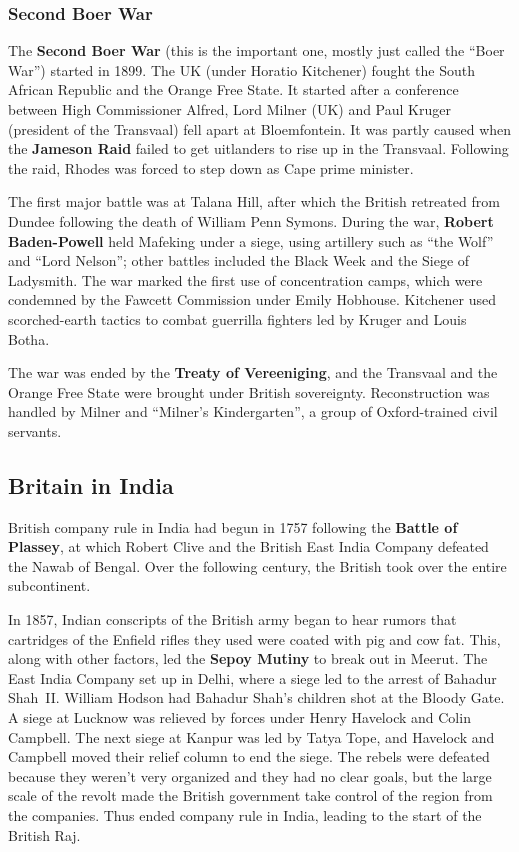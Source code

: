 \subsubsection*{Second Boer War}

The \textbf{Second Boer War}
(this is the important one, mostly just called the ``Boer War'') started in 1899.
The UK (under Horatio Kitchener) fought the South African Republic and the Orange Free State.
It started after a conference between High Commissioner Alfred, Lord Milner (UK)
and Paul Kruger (president of the Transvaal)
fell apart at Bloemfontein.
It was partly caused when the \textbf{Jameson Raid}
failed to get uitlanders to rise up in the Transvaal.
Following the raid, Rhodes was forced to step down as Cape prime minister.

The first major battle was at Talana Hill,
after which the British retreated from Dundee following the death of William Penn Symons.
During the war, \textbf{Robert Baden-Powell} held Mafeking under a siege,
using artillery such as ``the Wolf'' and ``Lord Nelson'';
other battles included the Black Week and the Siege of Ladysmith.
The war marked the first use of concentration camps,
which were condemned by the Fawcett Commission under Emily Hobhouse.
Kitchener used scorched-earth tactics to combat guerrilla fighters led by Kruger and Louis Botha.

The war was ended by the \textbf{Treaty of Vereeniging},
and the Transvaal and the Orange Free State were brought under British sovereignty.
Reconstruction was handled by Milner and ``Milner's Kindergarten'',
a group of Oxford-trained civil servants.

\subsection*{Britain in India}

British company rule in India had begun in 1757 following the \textbf{Battle of Plassey},
at which Robert Clive and the British East India Company defeated the Nawab of Bengal.
Over the following century, the British took over the entire subcontinent.

In 1857,
Indian conscripts of the British army began to hear rumors
that cartridges of the Enfield rifles they used
were coated with pig and cow fat.
This, along with other factors, led the \textbf{Sepoy Mutiny} to break out in Meerut.
The East India Company set up in Delhi, where a siege led to the arrest of Bahadur Shah~II\@.
William Hodson had Bahadur Shah's children shot at the Bloody Gate.
A siege at Lucknow was relieved by forces under Henry Havelock and Colin Campbell.
The next siege at Kanpur was led by Tatya Tope,
and Havelock and Campbell moved their relief column to end the siege.
The rebels were defeated because they weren't very organized and they had no clear goals,
but the large scale of the revolt made the British government
take control of the region from the companies.
Thus ended company rule in India, leading to the start of the British Raj.
